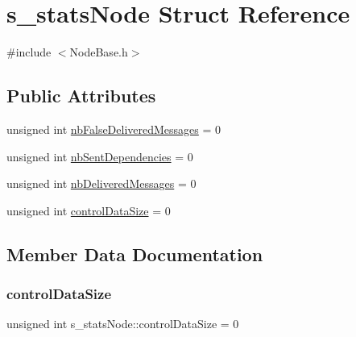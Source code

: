 \hypertarget{structs__stats_node}{}\section{s\+\_\+stats\+Node Struct Reference}
\label{structs__stats_node}


{\ttfamily \#include $<$Node\+Base.\+h$>$}

\subsection*{Public Attributes}
\begin{DoxyCompactItemize}
\item 
unsigned int \hyperlink{structs__stats_node_a009b1278ace8dbe831b9a3cdfef773e0}{nb\+False\+Delivered\+Messages} = 0
\item 
unsigned int \hyperlink{structs__stats_node_af01c78389a27c9eeff8033f6b3d3beee}{nb\+Sent\+Dependencies} = 0
\item 
unsigned int \hyperlink{structs__stats_node_a1e33dd5d17c1008ea127e4f86a7616e1}{nb\+Delivered\+Messages} = 0
\item 
unsigned int \hyperlink{structs__stats_node_aaffa71bc7f01bd767080163be60fbb50}{control\+Data\+Size} = 0
\end{DoxyCompactItemize}


\subsection{Member Data Documentation}
\mbox{\label{structs__stats_node_aaffa71bc7f01bd767080163be60fbb50}} 
\subsubsection{\texorpdfstring{control\+Data\+Size}{controlDataSize}}
{\footnotesize\ttfamily unsigned int s\+\_\+stats\+Node\+::control\+Data\+Size = 0}

\mbox{\label{structs__stats_node_a1e33dd5d17c1008ea127e4f86a7616e1}} 
